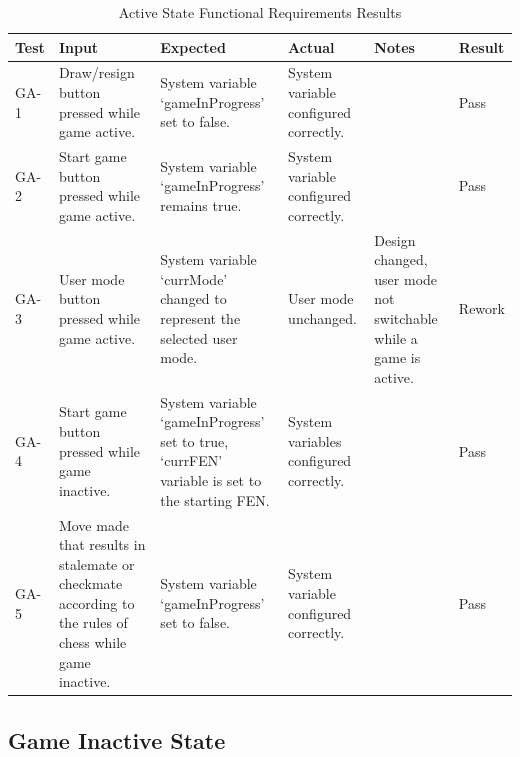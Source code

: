 \documentclass[12pt, titlepage]{article}
\begin{document}
\begin{table}[H]
    \centering
        \setlength{\leftmargini}{0cm}
        \begin{tabular}{| >{\centering\arraybackslash}m{1cm} | 
            >{\centering\arraybackslash}m{2.5cm} | 
            >{\centering\arraybackslash}m{4cm} | 
            >{\centering\arraybackslash}m{3cm} |
            >{\centering\arraybackslash}m{3cm} |
            >{\centering\arraybackslash}m{1.5cm} |}
        \hline
        \rowcolor[gray]{0.9}
        Test & Input & Expected & Actual & Notes & Result\\
        \hline
        GA-1 & Draw/resign button pressed while game active. & System variable `gameInProgress' set to false. &  System variable configured correctly. &  & Pass \\
        \hline
        GA-2 & Start game button pressed while game active. & System variable `gameInProgress' remains true. &  System variable configured correctly. &  & Pass \\
        \hline
        GA-3 & User mode button pressed while game active. & System variable `currMode' changed to represent the selected user mode. &  User mode unchanged. & Design changed, user mode not switchable while a game is active. & Rework \\
        \hline
        GA-4 & Start game button pressed while game inactive. & System variable `gameInProgress' set to true, `currFEN' variable is set to the starting FEN. &  System variables configured correctly. &  & Pass \\
        \hline
        GA-5 & Move made that results in stalemate or checkmate according to the rules of chess while game inactive. & System variable `gameInProgress' set to false. &  System variable configured correctly. &  & Pass \\ 
        \hline
        \end{tabular}
    \caption{Active State Functional Requirements Results}
\end{table}

\subsection{Game Inactive State}
\end{document}
